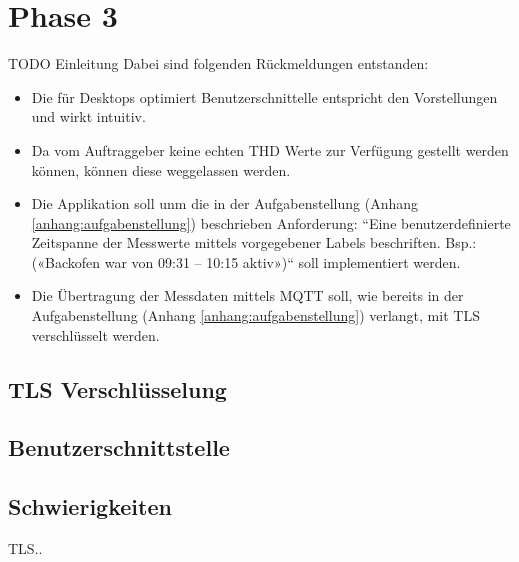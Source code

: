 \section{Phase 3}
TODO Einleitung
Dabei sind folgenden Rückmeldungen entstanden:
\begin{itemize}
    \item Die für Desktops optimiert Benutzerschnittelle entspricht den Vorstellungen und wirkt intuitiv.
    \item Da vom Auftraggeber keine echten \ac{THD} Werte zur Verfügung gestellt werden können,
    können diese weggelassen werden.
    \item Die Applikation soll unm die in der Aufgabenstellung (Anhang \ref{anhang:aufgabenstellung}) beschrieben Anforderung:
    ``Eine benutzerdefinierte Zeitspanne der Messwerte mittels vorgegebener 
    Labels beschriften. Bsp.: («Backofen war von 09:31 – 10:15 aktiv»)`` soll implementiert werden.
    \item Die Übertragung der Messdaten mittels \ac{MQTT} soll,
     wie bereits in der Aufgabenstellung (Anhang \ref{anhang:aufgabenstellung}) verlangt, mit \ac{TLS} verschlüsselt werden.
\end{itemize}

\subsection{TLS Verschlüsselung}

\subsection{Benutzerschnittstelle}

\subsection{Schwierigkeiten}
TLS..